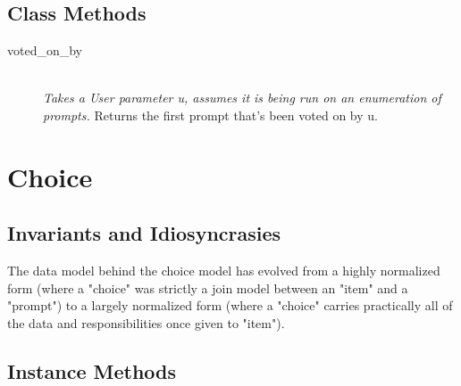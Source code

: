 \documentclass[11pt]{book}
\begin{document}
\subsection{Class Methods}

\begin{description}
  
  \item[voted\_on\_by]  \hfill \\
  \emph{Takes a User parameter u, assumes it is being run on an enumeration of prompts.}  Returns the first prompt that's been voted on by u.  
  
\end{description}




\section{Choice}

\subsection{Invariants and Idiosyncrasies}

The data model behind the choice model has evolved from a highly normalized form (where a "choice" was strictly a join model between an "item" and a "prompt") to a largely normalized form (where a "choice" carries practically all of the data and responsibilities once given to "item").



\subsection{Instance Methods}
\end{document}
